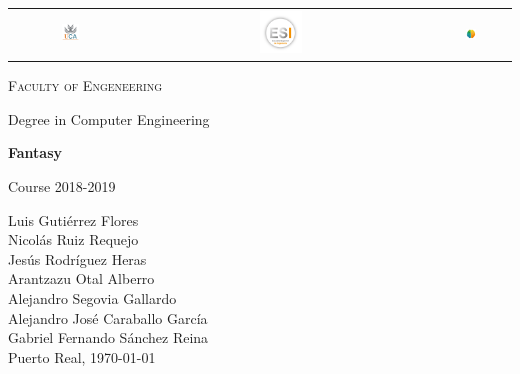 \documentclass{book}
\newenvironment{changemargin}[2]{%
	\begin{list}{}{%
			\setlength{\topsep}{0pt}%
			\setlength{\leftmargin}{#1}%
			\setlength{\rightmargin}{#2}%
			\setlength{\listparindent}{\parindent}%
			\setlength{\itemindent}{\parindent}%
			\setlength{\parsep}{\parskip}%
		}%
		\item[]}{\end{list}}
\begin{document}
\begin{titlepage}
\centering

\begin{table}[htb]
	\centering
	\begin{tabular}{ccc}
		\includegraphics[width=0.15\textwidth]{UCA.png}\par\vspace{0.2cm} & \includegraphics[width=0.15\textwidth]{ESI.png}\par\vspace{0.2cm} & \includegraphics[width=0.15\textwidth]{Stimey.png}\par\vspace{0.2cm}
	\end{tabular}
\end{table}


\begin{changemargin}{3em}{3em}
	\centering
	
	{\LARGE \textsc{\nohyphens{Faculty of Engeneering}}}
	
	\bigskip
	\bigskip
	\bigskip
	\bigskip
	
	{\LARGE \nohyphens{Degree in Computer Engineering}}
	
	\bigskip
	\bigskip
	\bigskip
	\bigskip
	\bigskip
	
	{\LARGE \nohyphens{\textbf{Fantasy}}}
	
	\bigskip
	\bigskip
	\bigskip
	\bigskip
	
	{\large Course 2018-2019}
	
	\bigskip
	\bigskip
	\bigskip
	\bigskip
	
\end{changemargin}

{\Large Luis Gutiérrez Flores\\
	Nicolás Ruiz Requejo\\
	Jesús Rodríguez Heras\\
	Arantzazu Otal Alberro\\
	Alejandro Segovia Gallardo\\
	Alejandro José Caraballo García\\
	Gabriel Fernando Sánchez Reina} \\
\bigskip
\bigskip 
\bigskip 
{\large Puerto Real, \today}

\end{titlepage}
\end{document}
